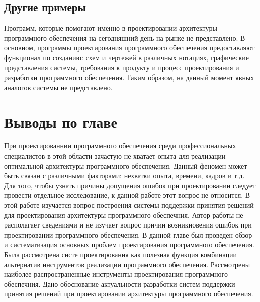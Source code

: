 \subsection{Другие примеры}
Программ, которые помогают именно в проектировании архитектуры программного обеспечения на сегодняшний день на рынке не представлено. В основном, программы проектирования программного обеспечения предоставляют функционал по созданию: схем и чертежей в различных нотациях, графические представления системы, требования к продукту и процесс проектирования и разработки программного обеспечения. Таким образом, на данный момент явных аналогов системы не представлено.

\section{Выводы по главе}\label{sec:ch1/conc}
При проектированнии программного обеспечения среди профессиональных специалистов в этой области зачастую не хватает опыта для реализации оптимальной архитектуры программного обеспечения. Данный феномен может быть связан с различными факторами:  нехватки опыта, времени, кадров и т.д. Для того, чтобы узнать причины допущения ошибок при проектировании следует провести отдельное исследование, к данной работе этот вопрос не относится. В этой работе изучается вопрос построения системы поддержки принятия решений для проектирования архитектуры программного обеспечния. Автор работы не располагает сведениями и не изучает вопрос причин возникновения ошибок при проектировании программного обеспечения.
В данной главе был проведен обзор и систематизация основных проблем проектирования программного обеспечения. Была рассмотрена систе проектирования как полезная функция комбинации альтернатив инструментов реализации программного обеспечения. Рассмотрены наиболее распространенные инструменты проектирования программного обеспечния. Дано обоснование актуальности разработки систем поддержки принятия решений при проектировании архитектуры программного обеспечения.
\clearpage
